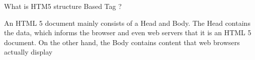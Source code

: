 What is HTM5 structure Based Tag ?

An HTML 5 document mainly consists of a Head and Body. The Head contains the data,
which informs the browser and even web servers that it is an HTML 5 document.
On the other hand, the Body contains content that web browsers actually display